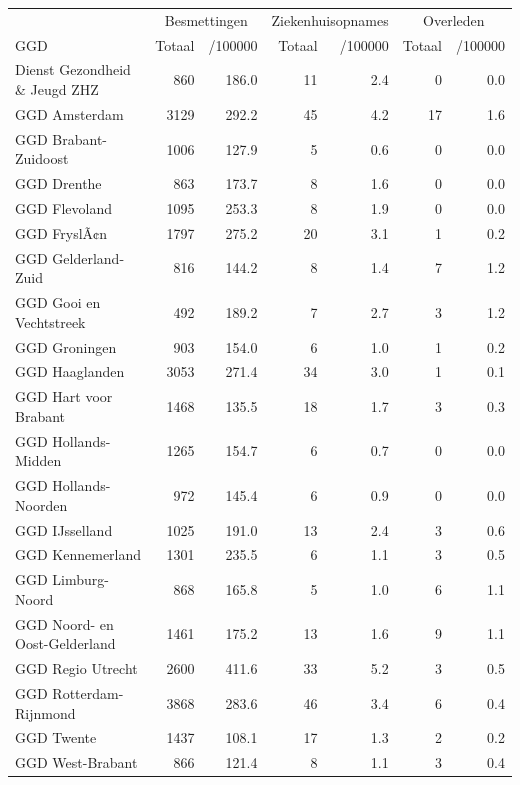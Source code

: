 \documentclass[
  english,
  man,floatsintext]{apa6}
\begin{document}
\begin{table}
\centering\begingroup\fontsize{10}{12}\selectfont

\begin{threeparttable}
\begin{tabular}{lrrrrrr}
\toprule
\multicolumn{1}{c}{ } & \multicolumn{2}{c}{Besmettingen} & \multicolumn{2}{c}{Ziekenhuisopnames} & \multicolumn{2}{c}{Overleden} \\
\cmidrule(l{3pt}r{3pt}){2-3} \cmidrule(l{3pt}r{3pt}){4-5} \cmidrule(l{3pt}r{3pt}){6-7}
GGD & Totaal & /100000 & Totaal & /100000 & Totaal & /100000\\
\midrule
Dienst Gezondheid \& Jeugd ZHZ & 860 & 186.0 & 11 & 2.4 & 0 & 0.0\\
GGD Amsterdam & 3129 & 292.2 & 45 & 4.2 & 17 & 1.6\\
GGD Brabant-Zuidoost & 1006 & 127.9 & 5 & 0.6 & 0 & 0.0\\
GGD Drenthe & 863 & 173.7 & 8 & 1.6 & 0 & 0.0\\
GGD Flevoland & 1095 & 253.3 & 8 & 1.9 & 0 & 0.0\\
GGD FryslÃ¢n & 1797 & 275.2 & 20 & 3.1 & 1 & 0.2\\
GGD Gelderland-Zuid & 816 & 144.2 & 8 & 1.4 & 7 & 1.2\\
GGD Gooi en Vechtstreek & 492 & 189.2 & 7 & 2.7 & 3 & 1.2\\
GGD Groningen & 903 & 154.0 & 6 & 1.0 & 1 & 0.2\\
GGD Haaglanden & 3053 & 271.4 & 34 & 3.0 & 1 & 0.1\\
GGD Hart voor Brabant & 1468 & 135.5 & 18 & 1.7 & 3 & 0.3\\
GGD Hollands-Midden & 1265 & 154.7 & 6 & 0.7 & 0 & 0.0\\
GGD Hollands-Noorden & 972 & 145.4 & 6 & 0.9 & 0 & 0.0\\
GGD IJsselland & 1025 & 191.0 & 13 & 2.4 & 3 & 0.6\\
GGD Kennemerland & 1301 & 235.5 & 6 & 1.1 & 3 & 0.5\\
GGD Limburg-Noord & 868 & 165.8 & 5 & 1.0 & 6 & 1.1\\
GGD Noord- en Oost-Gelderland & 1461 & 175.2 & 13 & 1.6 & 9 & 1.1\\
GGD Regio Utrecht & 2600 & 411.6 & 33 & 5.2 & 3 & 0.5\\
GGD Rotterdam-Rijnmond & 3868 & 283.6 & 46 & 3.4 & 6 & 0.4\\
GGD Twente & 1437 & 108.1 & 17 & 1.3 & 2 & 0.2\\
GGD West-Brabant & 866 & 121.4 & 8 & 1.1 & 3 & 0.4\\

\end{tabular}
\end{threeparttable}
\end{table}
\end{document}

